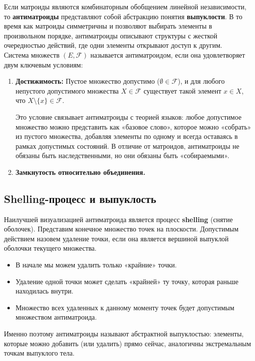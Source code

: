 Если матроиды являются комбинаторным обобщением линейной независимости, то \textbf{антиматроиды} представляют собой абстракцию понятия \textbf{выпуклости}. В то время как матроиды симметричны и позволяют выбирать элементы в произвольном порядке, антиматроиды описывают структуры с жесткой очередностью действий, где одни элементы открывают доступ к другим. \\

Система множеств $(E, \mathcal{F})$ называется антиматроидом, если она удовлетворяет двум ключевым условиям:
\begin{enumerate}
    \item \textbf{Достижимость:} Пустое множество допустимо ($\emptyset \in \mathcal{F}$), и для любого непустого допустимого множества $X \in \mathcal{F}$ существует такой элемент $x \in X$, что $X \setminus \{x\} \in \mathcal{F}$. 
    
    Это условие связывает антиматроиды с теорией языков: любое допустимое множество можно представить как «базовое слово», которое можно «собрать» из пустого множества, добавляя элементы по одному и всегда оставаясь в рамках допустимых состояний. В отличие от матроидов, антиматроиды не обязаны быть наследственными, но они обязаны быть «собираемыми».

    \item \textbf{Замкнутость относительно объединения.}
\end{enumerate}

\subsection{Shelling-процесс и выпуклость}

Наилучшей визуализацией антиматроида является процесс \textbf{shelling} (снятие оболочек). Представим конечное множество точек на плоскости. Допустимым действием назовем удаление точки, если она является вершиной выпуклой оболочки текущего множества.
\begin{itemize}
    \item В начале мы можем удалить только «крайние» точки. 
    \item Удаление одной точки может сделать «крайней» ту точку, которая раньше находилась внутри. 
    \item Множество всех удаленных к данному моменту точек будет допустимым множеством антиматроида.
\end{itemize}
Именно поэтому антиматроиды называют абстрактной выпуклостью: элементы, которые можно добавить (или удалить) прямо сейчас, аналогичны экстремальным точкам выпуклого тела.

